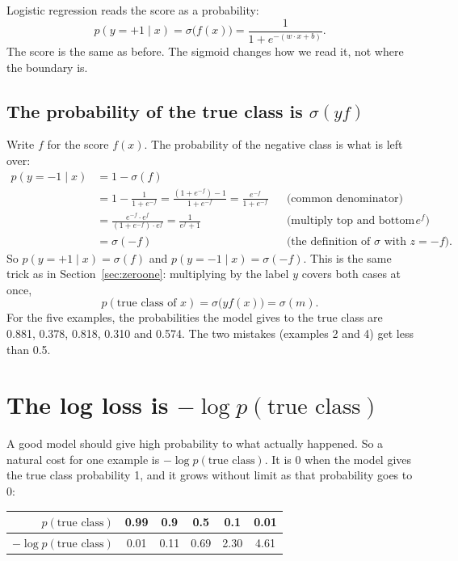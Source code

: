 \documentclass[11pt]{article}
\begin{document}
Logistic regression reads the score as a probability:
\[
  p(y = +1 \mid x) = \sigma\bigl(f(x)\bigr) = \frac{1}{1 + e^{-(w \cdot x + b)}} .
\]
The score is the same as before. The sigmoid changes how we read it, not where the boundary is.

\subsection*{The probability of the true class is $\sigma(y f)$}

Write $f$ for the score $f(x)$. The probability of the negative class is what is left over:
\begin{align*}
  p(y = -1 \mid x) &= 1 - \sigma(f) \\
    &= 1 - \frac{1}{1 + e^{-f}}
     = \frac{(1 + e^{-f}) - 1}{1 + e^{-f}}
     = \frac{e^{-f}}{1 + e^{-f}} && \text{(common denominator)} \\
    &= \frac{e^{-f} \cdot e^{f}}{(1 + e^{-f}) \cdot e^{f}}
     = \frac{1}{e^{f} + 1} && \text{(multiply top and bottom by } e^{f}\text{)} \\
    &= \sigma(-f) && \text{(the definition of } \sigma \text{ with } z = -f\text{)}.
\end{align*}
So $p(y = +1 \mid x) = \sigma(f)$ and $p(y = -1 \mid x) = \sigma(-f)$. This is the same trick as in
Section~\ref{sec:zeroone}: multiplying by the label $y$ covers both cases at once,
\[
  \boxed{\;p(\text{true class of } x) = \sigma\bigl(y f(x)\bigr) = \sigma(m).\;}
\]
For the five examples, the probabilities the model gives to the true class are 0.881, 0.378, 0.818,
0.310 and 0.574. The two mistakes (examples 2 and 4) get less than 0.5.

\section{The log loss is $-\log p(\text{true class})$}\label{sec:why}

A good model should give high probability to what actually happened. So a natural cost for one
example is $-\log p(\text{true class})$. It is 0 when the model gives the true class probability 1,
and it grows without limit as that probability goes to 0:

\begin{center}
\begin{tabular}{rccccc}
  \toprule
  $p(\text{true class})$ & 0.99 & 0.9 & 0.5 & 0.1 & 0.01 \\
  \midrule
  $-\log p(\text{true class})$ & 0.01 & 0.11 & 0.69 & 2.30 & 4.61 \\
  \bottomrule
\end{tabular}
\end{center}
\end{document}
